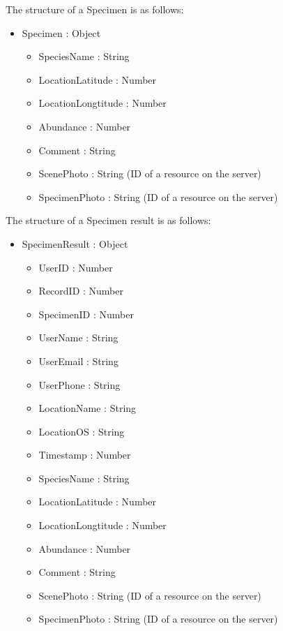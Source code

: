         The structure of a Specimen is as follows:
        \begin{itemize}
            \item Specimen : Object
            \begin{itemize}
                \item SpeciesName : String
                \item LocationLatitude : Number
                \item LocationLongtitude : Number
                \item Abundance : Number
                \item Comment : String
                \item ScenePhoto : String (ID of a resource on the server)
                \item SpecimenPhoto : String (ID of a resource on the server)
            \end{itemize}
        \end{itemize}
        
        The structure of a Specimen result is as follows:
        \begin{itemize}
        	\item SpecimenResult : Object
        	\begin{itemize}
	        	\item UserID : Number
	        	\item RecordID : Number
	        	\item SpecimenID : Number
        		\item UserName : String
        		\item UserEmail : String
        		\item UserPhone : String
        		\item LocationName : String
        		\item LocationOS : String
        		\item Timestamp : Number
        		\item SpeciesName : String
        		\item LocationLatitude : Number
        		\item LocationLongtitude : Number
        		\item Abundance : Number
        		\item Comment : String
        		\item ScenePhoto : String (ID of a resource on the server)
        		\item SpecimenPhoto : String (ID of a resource on the server)
        	\end{itemize}
        \end{itemize}

